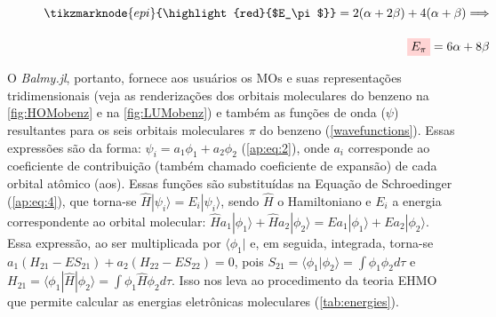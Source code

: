 \begin{figure}[htb]
\vspace{2\baselineskip}

\begin{equation}
\begin{split}
    \label{epi}
    \tikzmarknode{epi}{\highlight{red}{$E_\pi$}} = 2(\alpha + 2\beta) + 4(\alpha + \beta) \Longrightarrow \\[0.35cm] \highlight{red}{$E_\pi$} = 6\alpha + 8\beta
\end{split}
\end{equation}
\end{figure}

O \textit{Balmy.jl}, portanto, fornece aos usuários os \gls{MOs} e suas representações tridimensionais (veja as renderizações dos orbitais moleculares do benzeno na \autoref{fig:HOMobenz} e na \autoref{fig:LUMobenz}) e também as funções de onda ($\psi$) resultantes para os seis orbitais moleculares $\pi$ do benzeno (\autoref{wavefunctions}). Essas expressões são da forma: $\psi_i = a_1 \phi_1 + a_2 \phi_2$ (\autoref{ap:eq:2}), onde $a_i$ corresponde ao coeficiente de contribuição (também chamado coeficiente de expansão) de cada orbital atômico (\gls{aos}). Essas funções são substituídas na Equação de Schroedinger (\autoref{ap:eq:4}), que torna-se $\hat{H} |\psi_i \rangle = E_i |\psi_i \rangle$, sendo $\hat{H}$ o Hamiltoniano e $E_i$ a energia correspondente ao orbital molecular: $\hat{H}a_1|\phi_1\rangle + \hat{H}a_2|\phi_2\rangle = Ea_1|\phi_1\rangle + Ea_2|\phi_2\rangle$. Essa expressão, ao ser multiplicada por $\langle \phi_1 |$ e, em seguida, integrada, torna-se $a_1(H_{21} - ES_{21}) + a_2(H_{22} - ES_{22}) = 0$, pois $S_{21} = \langle \phi_1 | \phi_2 \rangle = \displaystyle \int \phi_1 \phi_2 d\tau$ e $H_{21} = \langle \phi_1 | \hat{H} | \phi_2 \rangle = \displaystyle \int \phi_1 \hat{H} \phi_2 d\tau$. Isso nos leva ao procedimento da teoria \gls{EHMO} que permite calcular as energias eletrônicas moleculares (\autoref{tab:energies}).

